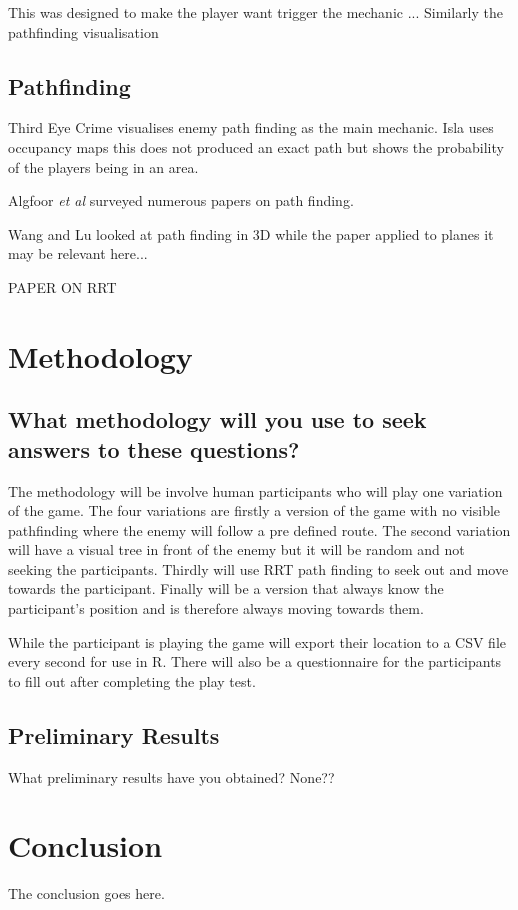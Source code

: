 \documentclass[journal]{IEEEtran}
\begin{document}
 This was designed to make the player want trigger the mechanic ...  Similarly the pathfinding visualisation  


\subsection{Pathfinding}
Third Eye Crime \cite{Isla2014} visualises enemy path finding as the main mechanic. Isla uses occupancy maps this does not produced an exact path but shows the probability of the players being in an area. 

Algfoor \textit{et al} surveyed numerous papers on path finding. 

Wang and Lu looked at path finding in 3D while the paper applied to planes it may be relevant here... \cite{wang2012}

PAPER ON RRT



\section{Methodology}
\subsection{What methodology will you use to seek answers to these questions?}
The methodology will be involve human participants who will play one variation of the game. The four variations are firstly a version of the game with no visible pathfinding where the enemy will follow a pre defined route. The second variation will have a visual tree in front of the enemy but it will be random and not seeking the participants. Thirdly will use RRT path finding to seek out and move towards the participant. Finally will be a version that always know the participant's position and is therefore always moving towards them.

While the participant is playing the game will export their location to a CSV file every second for use in R. There will also be a questionnaire for the participants to fill out after completing the play test.


\subsection{Preliminary Results}
What preliminary results have you obtained?
None??


\section{Conclusion}
The conclusion goes here.







\end{document}
